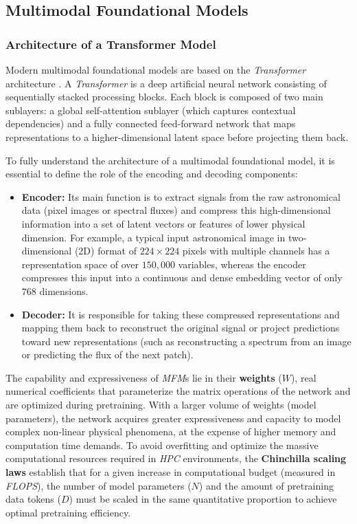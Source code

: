 \subsection{Multimodal Foundational Models} \label{sec:tb:MFM}

\subsubsection{Architecture of a Transformer Model} \label{sec:tb:arq}

Modern multimodal foundational models are based on the \textit{Transformer} architecture \autocite{ar:attention}. A \textit{Transformer} is a deep artificial neural network consisting of sequentially stacked processing blocks. Each block is composed of two main sublayers: a global self-attention sublayer (which captures contextual dependencies) and a fully connected feed-forward network that maps representations to a higher-dimensional latent space before projecting them back. 

To fully understand the architecture of a multimodal foundational model, it is essential to define the role of the encoding and decoding components:

\begin{itemize}
	\item \textbf{Encoder:} Its main function is to extract signals from the raw astronomical data (pixel images or spectral fluxes) and compress this high-dimensional information into a set of latent vectors or features of lower physical dimension. For example, a typical input astronomical image in two-dimensional (2D) format of $224 \times 224$ pixels with multiple channels has a representation space of over $150,000$ variables, whereas the encoder compresses this input into a continuous and dense embedding vector of only $768$ dimensions.
	\item \textbf{Decoder:} It is responsible for taking these compressed representations and mapping them back to reconstruct the original signal or project predictions toward new representations (such as reconstructing a spectrum from an image or predicting the flux of the next patch).
\end{itemize}


The capability and expressiveness of \textit{\gls{MFM}}s lie in their \textbf{weights} ($W$), real numerical coefficients that parameterize the matrix operations of the network and are optimized during pretraining. With a larger volume of weights (model parameters), the network acquires greater expressiveness and capacity to model complex non-linear physical phenomena, at the expense of higher memory and computation time demands. To avoid overfitting and optimize the massive computational resources required in \textit{\gls{HPC}} environments, the \textbf{Chinchilla scaling laws} \autocite{ar:hoffmann-2022} establish that for a given increase in computational budget (measured in \textit{\gls{FLOPS}}), the number of model parameters ($N$) and the amount of pretraining data tokens ($D$) must be scaled in the same quantitative proportion to achieve optimal pretraining efficiency.


